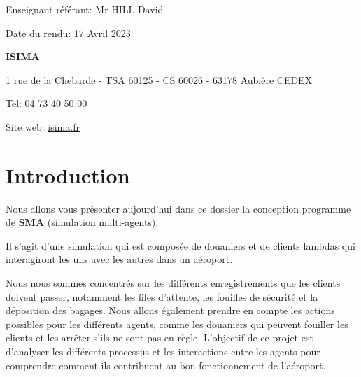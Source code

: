 \documentclass[12pt,french]{article} %
\begin{document}
\begin{titlepage}
  \vspace*{2cm} 
  
  \begin{flushright}\footnotesize %
    Enseignant référant: Mr HILL David
    
    Date du rendu: 17 Avril 2023
    
  \end{flushright}
  
  \begin{flushleft}\small %
    \textbf{ISIMA}
    \footnotesize
    
    1 rue de la Chebarde - TSA 60125 - CS 60026 - 63178 Aubière CEDEX
    
    Tel: 04 73 40 50 00
    
    Site web: \href{https://www.isima.fr/}{isima.fr}\newline
    	
  \end{flushleft}
\end{titlepage}	


\renewcommand{\contentsname}{Sommaire}
\normalsize\tableofcontents %

\bigskip

\newpage
\section{Introduction}

Nous allons vous présenter aujourd'hui dans ce dossier la conception programme de \textbf{SMA} (simulation multi-agents).

\bigskip

Il s'agit d'une simulation qui est composée de douaniers et de clients lambdas qui interagiront les uns avec les autres dans un aéroport.

\bigskip

 Nous nous sommes concentrés sur les différents enregistrements que les clients doivent passer, notamment les files d'attente, les fouilles de sécurité et la déposition des bagages. Nous allons également prendre en compte les actions possibles pour les différents agents, comme les douaniers qui peuvent fouiller les clients et les arrêter s'ils ne sont pas en règle. L'objectif de ce projet est d'analyser les différents processus et les interactions entre les agents pour comprendre comment ils contribuent au bon fonctionnement de l'aéroport.
 
\end{document}
